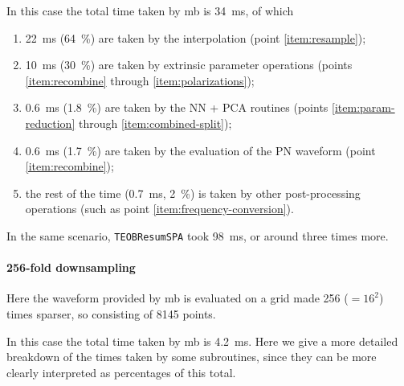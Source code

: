 \documentclass[main.tex]{subfiles}
\begin{document}
In this case the total time taken by \ac{mb} is \SI{34}{ms}, of which 
\begin{enumerate}
    \item \SI{22}{ms} (\SI{64}{\%}) are taken by the interpolation (point \ref{item:resample});
    \item \SI{10}{ms} (\SI{30}{\%}) are taken by extrinsic parameter operations (points \ref{item:recombine} through \ref{item:polarizations});
    \item \SI{0.6}{ms} (\SI{1.8}{\%}) are taken by the \ac{NN} + \ac{PCA} routines (points \ref{item:param-reduction} through \ref{item:combined-split});
    \item \SI{0.6}{ms} (\SI{1.7}{\%}) are taken by the evaluation of the \ac{PN} waveform (point \ref{item:recombine});
    \item the rest of the time (\SI{0.7}{ms}, \SI{2}{\%}) is taken by other post-processing operations (such as point \ref{item:frequency-conversion}).
\end{enumerate}

In the same scenario, \texttt{TEOBResumSPA} took \SI{98}{ms}, or around three times more. 

\paragraph{256-fold downsampling}

Here the waveform provided by \ac{mb} is evaluated on a grid made 256 (\( = 16^2\)) times sparser, so consisting of 8145 points.

In this case the total time taken by \ac{mb} is \SI{4.2}{ms}.
Here we give a more detailed breakdown of the times taken by some subroutines, since they can be more clearly interpreted as percentages of this total. 
\end{document}
